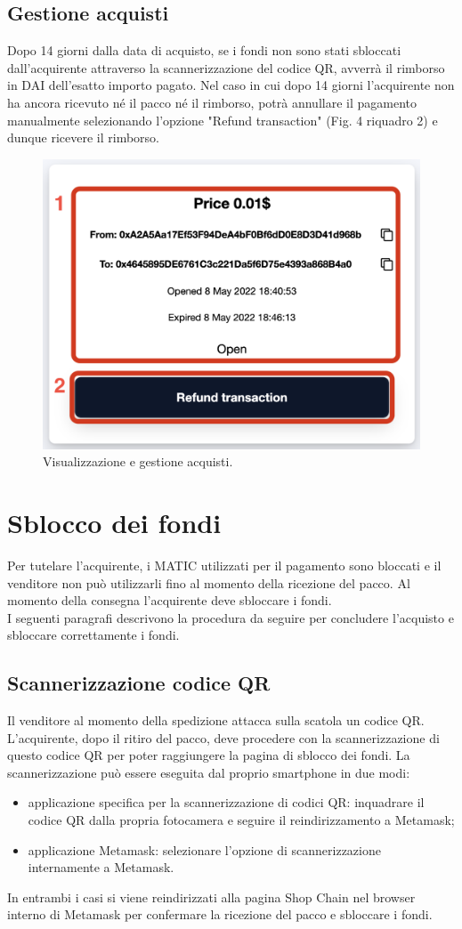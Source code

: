 \documentclass[a4paper, 12pt]{article}
\begin{document}
\subsection{Gestione acquisti}
Dopo 14 giorni dalla data di acquisto, se i fondi non sono stati sbloccati dall'acquirente attraverso la scannerizzazione del codice QR, avverrà il rimborso in DAI dell'esatto importo pagato. Nel caso in cui dopo 14 giorni l'acquirente non ha ancora ricevuto né il pacco né il rimborso, potrà annullare il pagamento manualmente selezionando l'opzione "Refund transaction" (Fig. 4 riquadro 2) e dunque ricevere il rimborso.\\
\FloatBarrier
\begin{figure}[!h]
\centering
\includegraphics[width=0.7\linewidth]{img/transazione_acquirente.png}
\caption{Visualizzazione e gestione acquisti.}
\end{figure}
\FloatBarrier

\newpage
\section{Sblocco dei fondi}
Per tutelare l'acquirente, i MATIC utilizzati per il pagamento sono bloccati e il venditore non può utilizzarli fino al momento della ricezione del pacco. Al momento della consegna l'acquirente deve sbloccare i fondi.\\
I seguenti paragrafi descrivono la procedura da seguire per concludere l'acquisto e sbloccare correttamente i fondi.
\subsection{Scannerizzazione codice QR}
Il venditore al momento della spedizione attacca sulla scatola un codice QR. L'acquirente, dopo il ritiro del pacco, deve procedere con la scannerizzazione di questo codice QR per poter raggiungere la pagina di sblocco dei fondi. La scannerizzazione può essere eseguita dal proprio smartphone in due modi:
\begin{itemize}
\item applicazione specifica per la scannerizzazione di codici QR: inquadrare il codice QR dalla propria fotocamera e seguire il reindirizzamento a Metamask;
\item applicazione Metamask: selezionare l'opzione di scannerizzazione internamente a Metamask.
\end{itemize}
In entrambi i casi si viene reindirizzati alla pagina Shop Chain nel browser interno di Metamask per confermare la ricezione del pacco e sbloccare i fondi.
\end{document}
